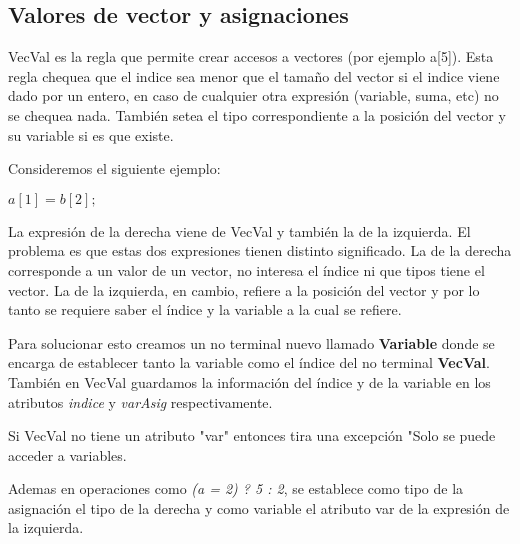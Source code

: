 \subsection{Valores de vector y asignaciones}
VecVal es la regla que permite crear accesos a vectores (por ejemplo a[5]). Esta regla chequea que el indice sea menor que el tamaño del vector si el indice viene dado por un entero, en caso de cualquier otra expresión (variable, suma, etc) no se chequea nada. También setea el tipo correspondiente a la posición del vector y su variable si es que existe.

Consideremos el siguiente ejemplo:

$a[1] = b[2];$

La expresión de la derecha viene de VecVal y también la de la izquierda. El problema es que estas dos expresiones tienen distinto significado. La de la derecha corresponde a un valor de un vector, no interesa el índice ni que tipos tiene el vector. La de la izquierda, en cambio, refiere a la posición del vector y por lo tanto se requiere saber el índice y la variable a la cual se refiere.

Para solucionar esto creamos un no terminal nuevo llamado \textbf{Variable} donde se encarga de establecer tanto la variable como el índice del no terminal \textbf{VecVal}. También en VecVal guardamos la información del índice y de la variable en los atributos \textit{indice} y \textit{varAsig} respectivamente.

Si VecVal no tiene un atributo "var" entonces tira una excepción "Solo se puede acceder a variables.

Ademas en operaciones como \textit{(a = 2) ? 5 : 2}, se establece como tipo de la asignación el tipo de la derecha y como variable el atributo var de la expresión de la izquierda.


